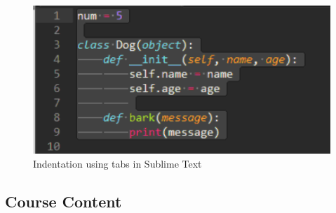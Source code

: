\documentclass{article}
\newenvironment{answer}{}{}
\newenvironment{faq}{\begin{description}}{\end{description}}
\begin{document}
\begin{faq}
\begin{answer}
			\begin{figure}[htb]
				\centering
				\caption{Indentation using tabs in Sublime Text} \label{Indentation using tabs in Sublime Text}
				\includegraphics[scale=.5]{spaces_indentation}
			\end{figure}
		\end{answer}
	\end{faq}
	
	\clearpage
	
	\subsection*{\LARGE Course Content}
	
\end{document}
